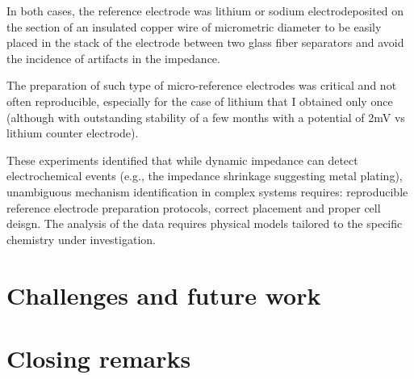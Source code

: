 In both cases, the reference electrode was lithium or sodium electrodeposited on the section of an insulated copper wire of micrometric diameter to be easily placed in the stack of the electrode between two glass fiber separators and avoid the incidence of artifacts in the impedance.

The preparation of such type of micro-reference electrodes was critical and not often reproducible, especially for the case of lithium that I obtained only once (although with outstanding stability of a few months with a potential of 2mV vs lithium counter electrode).

These experiments identified that while dynamic impedance can detect electrochemical events (e.g., the impedance shrinkage suggesting metal plating), unambiguous mechanism identification in complex systems requires: reproducible reference electrode preparation protocols, correct placement and proper cell deisgn. The analysis of the data requires physical models tailored to the specific chemistry under investigation. 

\section{Challenges and future work}



\section{Closing remarks}